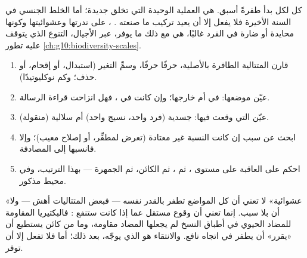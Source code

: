 \begin{proposition}\label{prop:g11:mutations:source}
كل  لكل  بدأ طفرةً  أسبق.  هي العملية الوحيدة
التي تخلق  جديدة؛ أما الخلط الجنسي في السنة الأخيرة فلا
يفعل إلا أن يعيد تركيب ما صنعته . ، على ندرتها وعشوائيتها
وكونها محايدة أو ضارة في الفرد غالبًا، هي مع ذلك ما يوفر، عبر الأجيال،
التنوع الذي يتوقف عليه تطور \cref{ch:g10:biodiversity-scales}.
\end{proposition}
\admitted

\begin{method}\label{met:g11:mutations:analyse}
\begin{enumerate}
  \item قارن المتتالية الطافرة بالأصلية، حرفًا حرفًا، وسمِّ التغير
        (استبدال، أو إقحام، أو حذف؛ وكم نوكليوتيدًا).
  \item عيّن موضعها: في  أم خارجها؛ وإن كانت في ، فهل
        انزاحت قراءة الرسالة.
  \item عيّن  التي وقعت فيها: جسدية (فرد واحد، نسيج واحد) أم
        سلالية (منقولة).
  \item ابحث عن سبب إن كانت النسبة غير معتادة (تعرض لمطفِّر، أو إصلاح
        معيب)؛ وإلا فانسبها إلى المصادفة.
  \item احكم على العاقبة على مستوى ، ثم ، ثم الكائن، ثم
        الجمهرة --- بهذا الترتيب، وفي محيط مذكور.
\end{enumerate}
\end{method}

\begin{remark}\label{rem:g11:mutations:random}
«عشوائية» لا تعني أن كل المواضع تطفر بالقدر نفسه --- فبعض المتتاليات
أهش --- ولا أن  بلا سبب. إنما تعني أن وقوع  مستقل عما إذا
كانت ستنفع : فالبكتيريا المقاومة للمضاد الحيوي في أطباق النسخ لم
يجعلها المضاد مقاومة، وما من كائن يستطيع أن «يقرر» أن يطفر في اتجاه
نافع. والانتقاء هو الذي يوجّه، بعد ذلك؛ أما  فلا تفعل إلا أن
توفر.
\end{remark}

